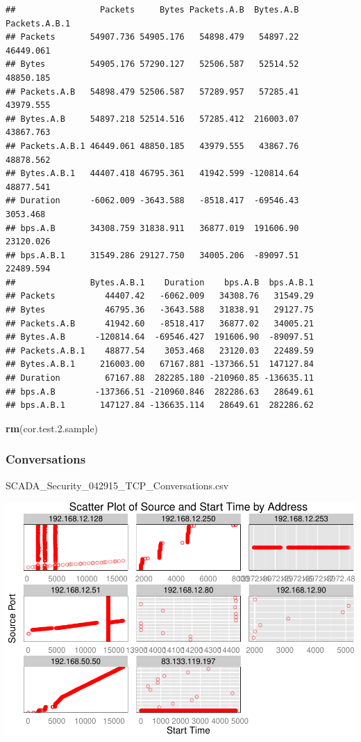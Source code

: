 \documentclass[]{article}
\newenvironment{Shaded}{\begin{snugshade}}{\end{snugshade}}
\newcommand{\KeywordTok}[1]{\textcolor[rgb]{0.13,0.29,0.53}{\textbf{{#1}}}}
\newcommand{\FloatTok}[1]{\textcolor[rgb]{0.00,0.00,0.81}{{#1}}}
\newcommand{\NormalTok}[1]{{#1}}
\begin{document}
\begin{verbatim}
##                 Packets     Bytes Packets.A.B  Bytes.A.B Packets.A.B.1
## Packets       54907.736 54905.176   54898.479   54897.22     46449.061
## Bytes         54905.176 57290.127   52506.587   52514.52     48850.185
## Packets.A.B   54898.479 52506.587   57289.957   57285.41     43979.555
## Bytes.A.B     54897.218 52514.516   57285.412  216003.07     43867.763
## Packets.A.B.1 46449.061 48850.185   43979.555   43867.76     48878.562
## Bytes.A.B.1   44407.418 46795.361   41942.599 -120814.64     48877.541
## Duration      -6062.009 -3643.588   -8518.417  -69546.43      3053.468
## bps.A.B       34308.759 31838.911   36877.019  191606.90     23120.026
## bps.A.B.1     31549.286 29127.750   34005.206  -89097.51     22489.594
##               Bytes.A.B.1    Duration    bps.A.B  bps.A.B.1
## Packets          44407.42   -6062.009   34308.76   31549.29
## Bytes            46795.36   -3643.588   31838.91   29127.75
## Packets.A.B      41942.60   -8518.417   36877.02   34005.21
## Bytes.A.B      -120814.64  -69546.427  191606.90  -89097.51
## Packets.A.B.1    48877.54    3053.468   23120.03   22489.59
## Bytes.A.B.1     216003.00   67167.881 -137366.51  147127.84
## Duration         67167.88  282285.180 -210960.85 -136635.11
## bps.A.B        -137366.51 -210960.846  282286.63   28649.61
## bps.A.B.1       147127.84 -136635.114   28649.61  282286.62
\end{verbatim}

\begin{Shaded}
\begin{Highlighting}[]
\KeywordTok{rm}\NormalTok{(cor.test}\FloatTok{.2}\NormalTok{.sample)}
\end{Highlighting}
\end{Shaded}

\subsubsection{Conversations}\label{conversations}

SCADA\_Security\_042915\_TCP\_Conversations.csv

\pagebreak

\begin{center}\includegraphics{edaReport_files/figure-latex/unnamed-chunk-22-1} \end{center}
\end{document}

